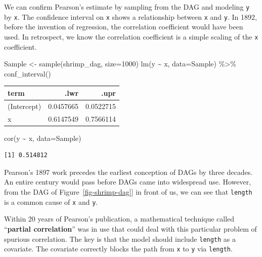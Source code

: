 \documentclass[
  letterpaper,
  DIV=11,
  numbers=noendperiod,
  oneside]{scrreprt}
\newenvironment{Shaded}{\begin{snugshade}}{\end{snugshade}}
\newcommand{\AttributeTok}[1]{\textcolor[rgb]{0.40,0.45,0.13}{#1}}
\newcommand{\DecValTok}[1]{\textcolor[rgb]{0.68,0.00,0.00}{#1}}
\newcommand{\FunctionTok}[1]{\textcolor[rgb]{0.28,0.35,0.67}{#1}}
\newcommand{\NormalTok}[1]{\textcolor[rgb]{0.00,0.23,0.31}{#1}}
\newcommand{\OtherTok}[1]{\textcolor[rgb]{0.00,0.23,0.31}{#1}}
\newcommand{\SpecialCharTok}[1]{\textcolor[rgb]{0.37,0.37,0.37}{#1}}
\begin{document}
We can confirm Pearson's estimate by sampling from the DAG and modeling
\texttt{y} by \texttt{x}. The confidence interval on \texttt{x} shows a
relationship between \texttt{x} and \texttt{y}. In 1892, before the
invention of regression, the correlation coefficient would have been
used. In retrospect, we know the correlation coefficient is a simple
scaling of the \texttt{x} coefficient.

\begin{Shaded}
\begin{Highlighting}[]
\NormalTok{Sample }\OtherTok{\textless{}{-}} \FunctionTok{sample}\NormalTok{(shrimp\_dag, }\AttributeTok{size=}\DecValTok{1000}\NormalTok{)}
\FunctionTok{lm}\NormalTok{(y }\SpecialCharTok{\textasciitilde{}}\NormalTok{ x, }\AttributeTok{data=}\NormalTok{Sample) }\SpecialCharTok{\%\textgreater{}\%} \FunctionTok{conf\_interval}\NormalTok{()}
\end{Highlighting}
\end{Shaded}

\ttfamily 
\begin{tabular}{lrr}
\toprule
term & .lwr & .upr\\
\midrule
(Intercept) & 0.0457665 & 0.0522715\\
x & 0.6147549 & 0.7566114\\
\bottomrule
\end{tabular} \normalfont
\bigskip

\begin{Shaded}
\begin{Highlighting}[]
\FunctionTok{cor}\NormalTok{(y }\SpecialCharTok{\textasciitilde{}}\NormalTok{ x, }\AttributeTok{data=}\NormalTok{Sample)}
\end{Highlighting}
\end{Shaded}

\begin{verbatim}
[1] 0.514812
\end{verbatim}

Pearson's 1897 work precedes the earliest conception of DAGs by three
decades. An entire century would pass before DAGs came into widespread
use. However, from the DAG of Figure~\ref{fig-shrimp-dag}{]} in front of
us, we can see that \texttt{length} is a common cause of \texttt{x} and
\texttt{y}.

Within 20 years of Pearson's publication, a mathematical technique
called ``\textbf{partial correlation}'' was in use that could deal with
this particular problem of spurious correlation. The key is that the
model should include \texttt{length} as a covariate. The covariate
correctly blocks the path from \texttt{x} to \texttt{y} via
\texttt{length}.
\end{document}

